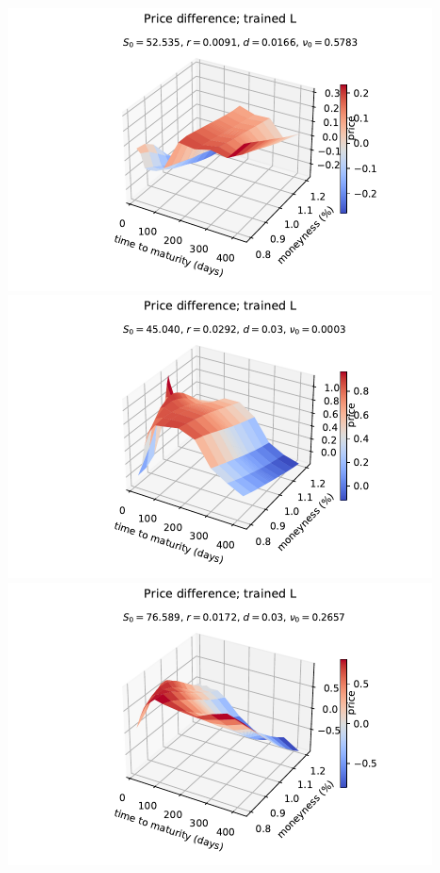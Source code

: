 \documentclass[
a4paper,     %
12pt           %
]{scrartcl}  %
\numberwithin{equation}{section}
\begin{document}
\begin{figure}
\begin{minipage}{0.49\textwidth}
	\includegraphics[width=\textwidth]{fig/Psurf_trained_diff_2017-01-01_rec_3lay_seed1}
\end{minipage}
\begin{minipage}{0.49\textwidth}
	\includegraphics[width=\textwidth]{fig/Psurf_trained_diff_2017-01-02_rec_3lay_seed1}
\end{minipage}
\begin{minipage}{0.49\textwidth}
	\includegraphics[width=\textwidth]{fig/Psurf_trained_diff_2017-01-03_rec_3lay_seed1}

\end{minipage}
\end{figure}
\end{document}
